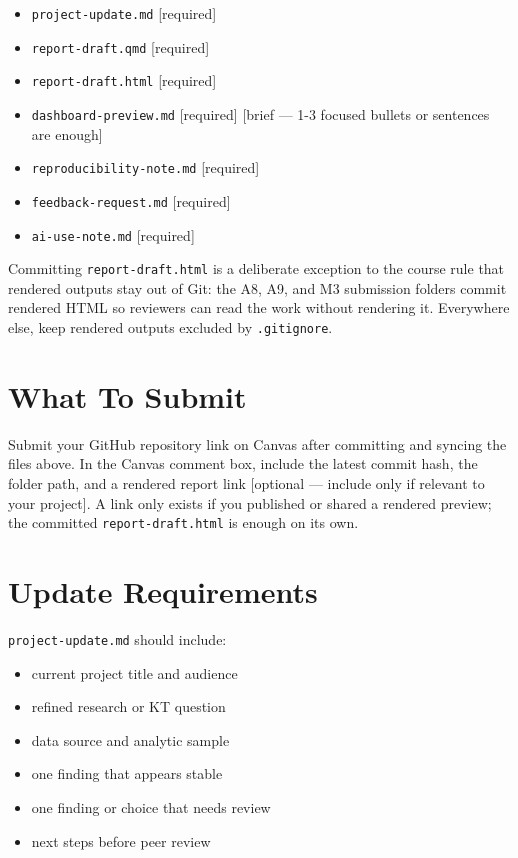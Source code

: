 \documentclass[
  letterpaper,
  DIV=11,
  numbers=noendperiod,
  oneside]{scrreprt}
\providecommand{\tightlist}{%
  \setlength{\itemsep}{0pt}\setlength{\parskip}{0pt}}
\begin{document}
\begin{itemize}
\tightlist
\item
  \texttt{project-update.md} {[}required{]}
\item
  \texttt{report-draft.qmd} {[}required{]}
\item
  \texttt{report-draft.html} {[}required{]}
\item
  \texttt{dashboard-preview.md} {[}required{]} {[}brief --- 1-3 focused
  bullets or sentences are enough{]}
\item
  \texttt{reproducibility-note.md} {[}required{]}
\item
  \texttt{feedback-request.md} {[}required{]}
\item
  \texttt{ai-use-note.md} {[}required{]}
\end{itemize}

Committing \texttt{report-draft.html} is a deliberate exception to the
course rule that rendered outputs stay out of Git: the A8, A9, and M3
submission folders commit rendered HTML so reviewers can read the work
without rendering it. Everywhere else, keep rendered outputs excluded by
\texttt{.gitignore}.

\section{What To Submit}\label{what-to-submit-13}

Submit your GitHub repository link on Canvas after committing and
syncing the files above. In the Canvas comment box, include the latest
commit hash, the folder path, and a rendered report link {[}optional ---
include only if relevant to your project{]}. A link only exists if you
published or shared a rendered preview; the committed
\texttt{report-draft.html} is enough on its own.

\section{Update Requirements}\label{update-requirements}

\texttt{project-update.md} should include:

\begin{itemize}
\tightlist
\item
  current project title and audience
\item
  refined research or KT question
\item
  data source and analytic sample
\item
  one finding that appears stable
\item
  one finding or choice that needs review
\item
  next steps before peer review
\end{itemize}
\end{document}
